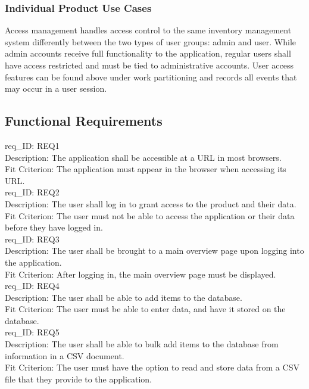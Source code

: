 \documentclass[12pt, titlepage]{article}
\begin{document}
\subsubsection{Individual Product Use Cases}
Access management handles access control to the same inventory management system differently between the two types of user groups: admin and user. While admin accounts receive full functionality to the application, regular users shall have access restricted and must be tied to administrative accounts. User access features can be found above under work partitioning and records all events that may occur in a user session.\\

\subsection{Functional Requirements}
req\_ID: \label{REQ1}REQ1\\
Description: The application shall be accessible at a URL in most browsers.\\
Fit Criterion: The application must appear in the browser when accessing its URL.\\

\noindent
req\_ID: \label{REQ2}REQ2\\
Description: The user shall log in to grant access to the product and their data.\\
Fit Criterion: The user must not be able to access the application or their data before they have logged in.\\

\noindent
req\_ID: \label{REQ3}REQ3\\
Description: The user shall be brought to a main overview page upon logging into the application.\\
Fit Criterion: After logging in, the main overview page must be displayed.\\

\noindent
req\_ID: \label{REQ4}REQ4\\
Description: The user shall be able to add items to the database.\\
Fit Criterion: The user must be able to enter data, and have it stored on the database.\\

\noindent
req\_ID: \label{REQ5}REQ5\\
Description: The user shall be able to bulk add items to the database from information in a CSV document.\\
Fit Criterion: The user must have the option to read and store data from a CSV file that they provide to the application.\\
\end{document}
